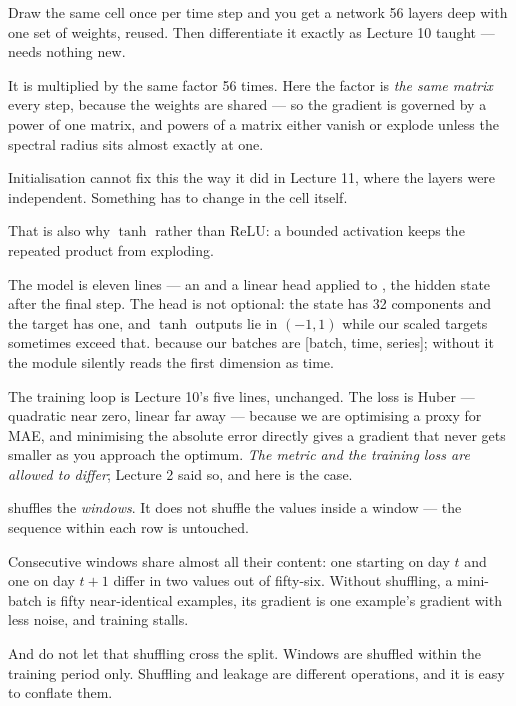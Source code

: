 \documentclass[11pt,a4paper]{article}
\begin{document}
Draw the same cell once per time step and you get a network 56 layers deep with
one set of weights, reused. Then differentiate it exactly as Lecture 10 taught
---  needs nothing new.

\begin{failbox}[title={Failure condition --- one matrix raised to the length of the sequence}]
It is multiplied by the same factor 56 times. Here the factor is \emph{the same
matrix} every step, because the weights are shared --- so the gradient is
governed by a power of one matrix, and powers of a matrix either vanish or
explode unless the spectral radius sits almost exactly at one.

Initialisation cannot fix this the way it did in Lecture 11, where the layers
were independent. Something has to change in the cell itself.
\end{failbox}

That is also why $\tanh$ rather than ReLU: a bounded activation keeps the
repeated product from exploding.

The model is eleven lines --- an  and a linear head applied to
, the hidden state after the final step. The head is not
optional: the state has 32 components and the target has one, and $\tanh$
outputs lie in $(-1,1)$ while our scaled targets sometimes exceed that.
 because our batches are [batch, time, series];
without it the module silently reads the first dimension as time.

The training loop is Lecture 10's five lines, unchanged. The loss is Huber ---
quadratic near zero, linear far away --- because we are optimising a proxy for
MAE, and minimising the absolute error directly gives a gradient that never
gets smaller as you approach the optimum. \emph{The metric and the training
loss are allowed to differ}; Lecture 2 said so, and here is the case.

\begin{keybox}[title={Shuffle, but shuffle the right thing}]
 shuffles the \emph{windows}. It
does not shuffle the values inside a window --- the sequence within each row is
untouched.

Consecutive windows share almost all their content: one starting on day $t$ and
one on day $t+1$ differ in two values out of fifty-six. Without shuffling, a
mini-batch is fifty near-identical examples, its gradient is one example's
gradient with less noise, and training stalls.

And do not let that shuffling cross the split. Windows are shuffled within the
training period only. Shuffling and leakage are different operations, and it is
easy to conflate them.
\end{keybox}
\end{document}

